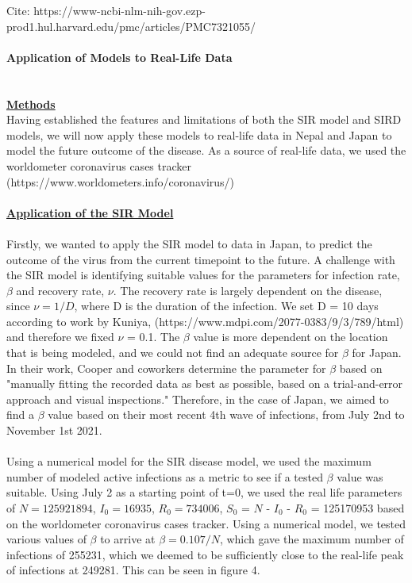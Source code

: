 \documentclass[11pt]{article}
\theoremstyle{definition}
\begin{document}
Cite: https://www-ncbi-nlm-nih-gov.ezp-prod1.hul.harvard.edu/pmc/articles/PMC7321055/
\\
\\
{\textbf{\Large Application of Models to Real-Life Data}}\\
\\
\\
\textbf{\underline{Methods}}\\
Having established the features and limitations of both the SIR model and SIRD models, we will now apply these models to real-life data in Nepal and Japan to model the future outcome of the disease. As a source of real-life data, we used the worldometer coronavirus cases tracker (https://www.worldometers.info/coronavirus/)
\\
\\
{\textbf{\underline {Application of the SIR Model}}\\
\\
Firstly, we wanted to apply the SIR model to data in Japan, to predict the outcome of the virus from the current timepoint to the future.
A challenge with the SIR model is identifying suitable values for the parameters for infection rate, $\beta$ and recovery rate, $\nu$. The recovery rate is largely dependent on the disease, since $\nu = 1/D$, where D is the duration of the infection. We set D = 10 days according to work by Kuniya, (https://www.mdpi.com/2077-0383/9/3/789/html) and therefore we fixed $\nu$ = 0.1. The $\beta$ value is more dependent on the location that is being modeled, and we could not find an adequate source for $\beta$ for Japan. In their work, Cooper and coworkers determine the parameter for $\beta$ based on "manually fitting the recorded data as best as possible, based on a trial-and-error approach and visual inspections." Therefore, in the case of Japan, we aimed to find a $\beta$ value based on their most recent 4th wave of infections, from July 2nd to November 1st 2021. 
\\
\\
Using a numerical model for the SIR disease model, we used the maximum number of modeled active infections as a metric to see if a tested $\beta$ value was suitable. Using July 2 as a starting point of t=0, we used the real life parameters of $N=125921894$, $I_{0} = 16935$, $R_{0} = 734006$, $S_{0}$ = $N$ - $I_{0}$ - $R_{0}$ = 125170953 based on the worldometer coronavirus cases tracker. Using a numerical model, we tested various values of $\beta$ to arrive at $\beta = 0.107/N$, which gave the maximum number of infections of 255231, which we deemed to be sufficiently close to the real-life peak of infections at 249281. This can be seen in figure 4. 
}
\end{document}
